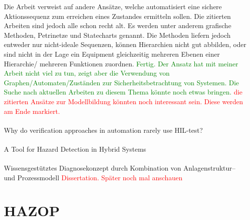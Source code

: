 Die Arbeit verweist auf andere Ans\"atze, welche automatisiert eine sichere Aktionssequenz zum erreichen eines Zustandes ermitteln sollen. Die zitierten Arbeiten sind jedoch alle schon recht alt. Es werden unter anderem grafische Methoden, Petrinetze und Statecharts genannt. Die Methoden liefern jedoch entweder nur nicht-ideale Sequenzen, k\"onnen Hierarchien nicht gut abbilden, oder sind nicht in der Lage ein Equipment gleichzeitig mehreren Ebenen einer Hierarchie/ mehreren Funktionen zuordnen.   \textcolor{green}{Fertig. Der Ansatz hat mit meiner Arbeit nicht viel zu tun, zeigt aber die Verwendung von Graphen/Automaten/Zust\"anden zur Sicherheitsbetrachtung von Systemen. Die Suche nach aktuellen Arbeiten zu diesem Thema k\"onnte noch etwas bringen.} \textcolor{red}{die zitierten Ans\"atze zur Modellbildung k\"onnten noch interessant sein. Diese werden am Ende markiert.}  

\paragraph*{\cite{Schetinin_2013}} Why do verification approaches in automation rarely use {HIL}-test?

\paragraph*{\cite{Herrmann_2000}} A Tool for Hazard Detection in Hybrid Systems

\paragraph*{\cite{Christiansen_2015}} Wissensgest{\"u}tztes Diagnosekonzept durch Kombination von Anlagenstruktur-- und Prozessmodell
\textcolor{red}{Dissertation. Sp\"ater noch mal anschauen}

\section{HAZOP}
